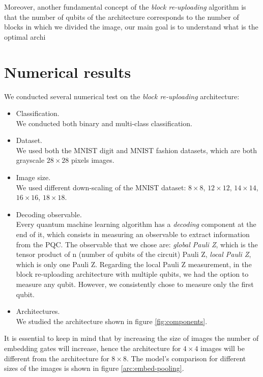 Moreover, another fundamental concept of the \textit{block re-uploading} algorithm is that the 
number of qubits of the architecture corresponds to the number of blocks in which we divided the 
image, our main goal is to understand what is the optimal archi


\section{Numerical results}

We conducted several numerical test on the \textit{block re-uploading} architecture:

\begin{itemize}
    \item Classification.\\
    We conducted both binary and multi-class classification.
    \item Dataset.\\
    We used both the MNIST digit and MNIST fashion datasets, which are both grayscale $28\times28$ pixels images.
    \item Image size.\\
    We used different down-scaling of the MNIST dataset: $8\times8$, $12\times12$, $14\times14$, 
    $16\times16$, $18\times18$.
    \item Decoding observable.\\
    Every quantum machine learning algorithm has a \textit{decoding} component at the end of it, which consists in 
    measuring an observable to extract information from the PQC.
    The observable that we chose are: \textit{global Pauli Z}, which is the tensor product of n (number of qubits
    of the circuit) Pauli Z, \textit{local Pauli Z}, which is only one Pauli Z.
    Regarding the local Pauli Z measurement, in the block re-uploading architecture with multiple qubits, 
    we had the option to measure any qubit. However, we consistently chose to measure only the first qubit.
    \item Architectures.\\
    We studied the architecture shown in figure \ref{fig:components}.
\end{itemize}


It is essential to keep in mind that by increasing the size of images the number of embedding gates will
increase, hence the architecture for $4\times4$ images will be different 
from the architecture for $8\times8$.
The model's comparison for different sizes of the images is shown in figure \ref{arc:embed-pooling}.

